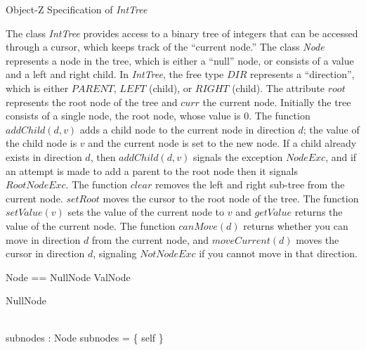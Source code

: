 
\begin{center}
\begin{large}
Object-Z Specification of {\em IntTree}
\end{large}
\end{center}

\noindent
The class {\em IntTree} provides access to a binary tree of integers that
can be accessed through a cursor, which keeps track of the ``current node.''
The class {\em Node} represents a node in the tree, which is either a
``null'' node, or consists of a value and a left and right child.
In {\em IntTree}, the free type $DIR$ represents a ``direction'', which
is either $PARENT$, $LEFT$ (child), or $RIGHT$ (child).
The attribute $root$ represents the root node of the tree
and $curr$ the current node.
Initially the tree consists of a single node, the root node, whose value
is 0.
The function $addChild(d,v)$ adds a child node to the current node in
direction $d$; the value of the child node is $v$ and the current node
is set to the new node.
If a child already exists in direction $d$, then $addChild(d,v)$ signals
the exception $NodeExc$, and if an attempt is made to add a parent to the
root node then it signals $RootNodeExc$.
The function $clear$ removes the left and right sub-tree from the current node.
$setRoot$ moves the cursor to the root node of the tree.
The function $setValue(v)$ sets the value of the current node to $v$ and
$getValue$ returns the value of the current node.
The function $canMove(d)$ returns whether you can move in direction $d$
from the current node, and $moveCurrent(d)$ moves the cursor in direction
$d$, signaling $NotNodeExc$ if you cannot move in that direction.

\begin{zed}
Node == NullNode \classuni ValNode
\end{zed}

\begin{class}{NullNode}
\begin{state}
	\Delta \\
	subnodes : \finset Node
\where
	subnodes = \{ self \}
\end{state}
\end{class}

